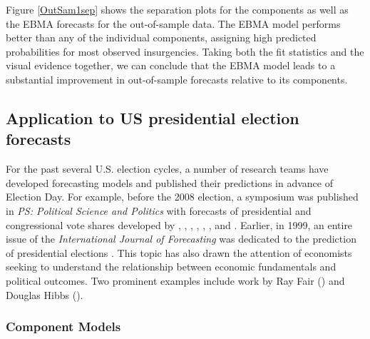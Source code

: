 \documentclass[pdftex,12pt,fullpage,oneside]{amsart}
\begin{document}
Figure \ref{OutSam1sep} shows the separation plots for the components
as well as the EBMA forecasts for the out-of-sample data.  The EBMA
model performs better than any of the individual components, assigning
high predicted probabilities for most observed insurgencies.  Taking
both the fit statistics and the visual evidence together, we can
conclude that the EBMA model leads to a substantial improvement in
out-of-sample forecasts relative to its components.




\subsection{Application to US presidential election forecasts}
For the past several U.S. election cycles, a number of research teams
have developed forecasting models and published their predictions in
advance of Election Day.  For example, before the 2008 election, a
symposium was published in \emph{PS: Political Science and Politics}
with forecasts of presidential and congressional vote shares developed
by \citet{Campbell:2008}, \citet{Norpoth:2008},
\citet{Lewis-Beck:Tien:2008}, \citet{Abramowitz:2008},
\citet{Erikson:Wlezien:2008}, \citet{Holbrook:2008},
\citet{Lockerbie:2008} and \citet{Cuzan:Bundrick:2008}. Earlier, in
1999, an entire issue of the \textit{International Journal of
  Forecasting} was dedicated to the prediction of presidential
elections \citep{Brown:1999}.  This topic has also drawn the attention
of economists seeking to understand the relationship between economic
fundamentals and political outcomes.  Two prominent examples include
work by Ray Fair (\citeyear{Fair:2010}) and Douglas Hibbs
(\citeyear{Hibbs:2000}).

\subsubsection{Component Models}
\end{document}
